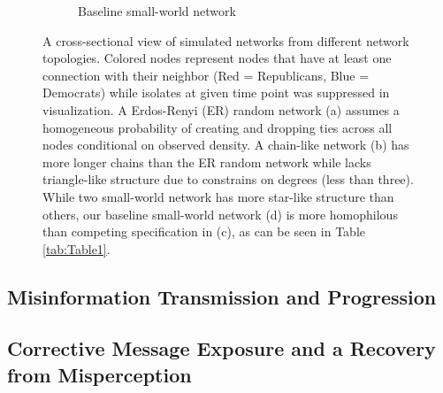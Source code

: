 \documentclass[man, 12pt, a4paper, noextraspace]{apa6}
\begin{document}
\begin{figure}
\begin{subfigure}[t]{0.45\textwidth}
        \caption{Baseline small-world network} \label{fig1:smallworld}
    \end{subfigure}
    
    \vspace{1cm}
    \captionsetup{format=hang}
    \caption{A cross-sectional view of simulated networks from different network topologies. Colored nodes represent nodes that have at least one connection with their neighbor (Red = Republicans, Blue = Democrats) while isolates at given time point was suppressed in visualization. A Erdos-Renyi (ER) random network (a) assumes a homogeneous probability of creating and dropping ties across all nodes conditional on observed density. A chain-like network (b) has more longer chains than the ER random network while lacks triangle-like structure due to constrains on degrees (less than three). While two small-world network has more star-like structure than others, our baseline small-world network (d) is more homophilous than competing specification in (c), as can be seen in Table \ref{tab:Table1}.} \label{fig:Figure1}
\end{figure}    

\subsection{Misinformation Transmission and Progression}

\subsection{Corrective Message Exposure and a Recovery from Misperception}


\printbibliography
\end{document}
